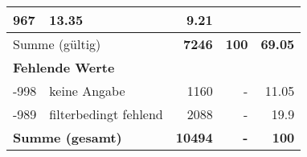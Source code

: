 \begin{longtable}{lXrrr}
       \num{967} &
       \num[round-mode=places,round-precision=2]{13,35} &
         \num[round-mode=places,round-precision=2]{9,21} \\
     \midrule
     \multicolumn{2}{l}{Summe (gültig)} &
       \textbf{\num{7246}} &
     \textbf{100} &
       \textbf{\num[round-mode=places,round-precision=2]{69,05}} \\
     \multicolumn{5}{l}{\textbf{Fehlende Werte}}\\
       -998 &
       keine Angabe &
         \num{1160} &
        - &
         \num[round-mode=places,round-precision=2]{11,05} \\
       -989 &
       filterbedingt fehlend &
         \num{2088} &
        - &
         \num[round-mode=places,round-precision=2]{19,9} \\
     \midrule
     \multicolumn{2}{l}{\textbf{Summe (gesamt)}} &
          \textbf{\num{10494}} &
        \textbf{-} &
        \textbf{100} \\
     \bottomrule
     \end{longtable}
     
